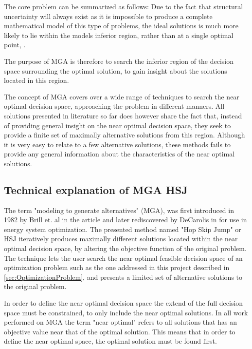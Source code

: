 
The core problem can be summarized as follows: Due to the fact that structural uncertainty will always exist as it is impossible to produce a complete mathematical model of this type of problems, the ideal solutions is much more likely to lie within the models inferior region, rather than at a single optimal point, \cite{Brill_MGA_1982}. 

The purpose of MGA is therefore to search the inferior region of the decision space surrounding the optimal solution, to gain insight about the solutions located in this region. 

The concept of MGA covers over a wide range of techniques to search the near optimal decision space, approaching the problem in different manners. All solutions presented in literature so far does however share the fact that, instead of providing general insight on the near optimal decision space, they seek to provide a finite set of maximally alternative solutions from this region. Although it is very easy to relate to a few alternative solutions, these methods fails to provide any general information about the characteristics of the near optimal solutions. 



\subsection{Technical explanation of MGA HSJ}


The term "modeling to generate alternatives" (MGA), was first introduced in 1982 by Brill et. al in the article \cite{Brill_MGA_1982} and later rediscovered by DeCarolis in \cite{DeCarolis_MGA} for use in energy system optimization. The presented method named "Hop Skip Jump" or HSJ iteratively produces maximally different solutions located within the near optimal decision space, by altering the objective function of the original problem. The technique lets the user search the near optimal feasible decision space of an optimization problem such as the one addressed in this project described in \ref{sec:OptimizationProblem}, and presents a limited set of alternative solutions to the original problem. 

In order to define the near optimal decision space the extend of the full decision space must be constrained, to only include the near optimal solutions. In all work performed on MGA the term "near optimal" refers to all solutions that has an objective value near that of the optimal solution. This means that in order to define the near optimal space, the optimal solution must be found first. 

